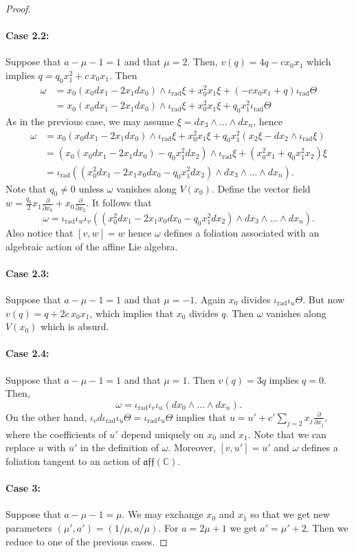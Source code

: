 \documentclass[10pt,a4paper]{amsart}
\def\CC{{\mathbb{C}}}
\newcommand{\del}[1]{\frac{\partial}{\partial #1}}
\DeclareMathOperator{\rad}{rad}
\begin{document}
\begin{proof}
 \paragraph{\textbf{Case 2.2:}} Suppose that $a-\mu-1 = 1$ and that $\mu = 2$. Then, $v(q) = 4q -cx_0x_1$ which implies $q = q_0x_1^2 +c\,x_0x_1$. Then
 \begin{align*}
 \omega &= x_0(x_0 dx_1 - 2x_1 dx_0) \wedge \iota_{\rad}\xi + x_0^2x_1 \xi + (-cx_0x_1 + q ) \iota_{\rad}\Theta\\
 & = x_0(x_0 dx_1 - 2x_1 dx_0) \wedge \iota_{\rad}\xi + x_0^2x_1 \xi + q_0x_1^2 \iota_{\rad}\Theta
 \end{align*}
 As in the previous case, we may assume $\xi = dx_3\wedge \dots\wedge dx_n$, hence 
 \begin{align*}
 \omega &= x_0(x_0 dx_1 - 2x_1 dx_0) \wedge \iota_{\rad}\xi + x_0^2x_1 \xi + q_0x_1^2(x_2\xi -dx_2\wedge \iota_{\rad}\xi) \\
 & = (x_0(x_0 dx_1 - 2x_1 dx_0) - q_0x_1^2 dx_2)\wedge \iota_{\rad}\xi + (x_0^2x_1 + q_0x_1^2x_2)\xi \\
 & = \iota_{\rad}( ( x_0^2 dx_1 - 2x_1x_0 dx_0 - q_0x_1^2 dx_2) \wedge dx_3 \wedge \dots \wedge dx_n).
 \end{align*}
 Note that $q_0 \neq 0$ unless $\omega$ vanishes along $V(x_0)$. Define the vector field $w = \frac{q_0}{2}x_1 \del{ x_0} + x_0 \del{ x_2}$. It follows that 
 \[
 \omega = \iota_{\rad}\iota_w \iota_v ( ( x_0^2 dx_1 - 2x_1x_0 dx_0 - q_0x_1^2 dx_2) \wedge dx_3 \wedge \dots \wedge dx_n).
 \]
 Also notice that $[v,w] = w$ hence $\omega$ defines a foliation associated with an algebraic action of the affine Lie algebra.
\\
 \paragraph{\textbf{Case 2.3:}} Suppose that $a-\mu-1 = 1$ and that $\mu = -1$. Again $x_0$ divides $\iota_{\rad}\iota_u \Theta$. But now $v(q) = q + 2c\, x_0x_1$, which implies that $x_0$ divides $q$. Then $\omega$ vanishes along $V(x_0)$ which is absurd. 
 \\
 \paragraph{\textbf{Case 2.4:}}
 Suppose that $a-\mu-1 = 1$ and that $\mu = 1$. Then $v(q) = 3q$ implies $q=0$. Then, 
 \[
 \omega = \iota_{\rad}\iota_v\iota_u (dx_0\wedge \dots \wedge dx_n). 
 \]
 On the other hand, $\iota_vd\iota_{\rad}\iota_u\Theta = \iota_{\rad}\iota_u\Theta$ implies that $u = u' + c'\sum_{j= 2}x_j \del{ x_j}$, where the coefficients of $u'$ depend uniquely on $x_0$ and $x_1$. Note that we can replace $u$ with $u'$ in the definition of $\omega$. Moreover, $[v,u']=u'$ and $\omega$ defines a foliation tangent to an action of $\mathfrak{aff}(\CC)$.
 \\
 \paragraph{\textbf{Case 3:}} Suppose that $a-\mu-1 = \mu$. We may exchange $x_0$ and $x_1$ so that we get new parameters $(\mu',a')= (1/\mu, a/\mu)$. For $a = 2\mu + 1$ we get $a' = \mu'+2$. Then we reduce to one of the previous cases. 
\end{proof}
\end{document}
